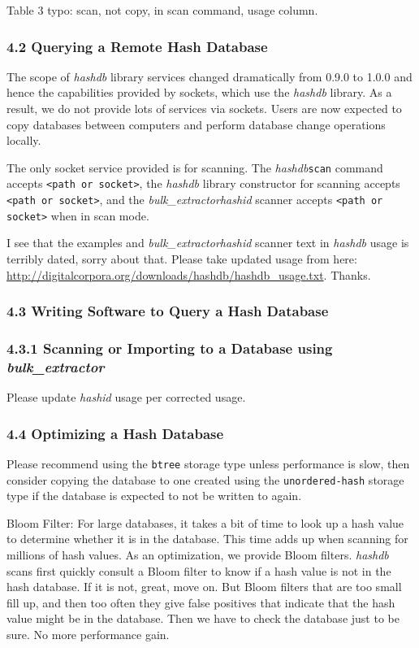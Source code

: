 \documentclass[12pt,twoside]{article}
\newcommand{\hdb}{\emph{hashdb}\xspace}
\newcommand{\bulk}{\emph{bulk\_extractor}\xspace}
\newcommand{\hid}{\emph{hashid}\xspace}
\begin{document}
Table 3 typo: scan, not copy, in scan command, usage column.

\subsubsection*{4.2 Querying a Remote Hash Database}
The scope of \hdb library services changed dramatically from 0.9.0 to 1.0.0
and hence the capabilities provided by sockets, which use the \hdb library.
As a result, we do not provide lots of services via sockets.
Users are now expected to copy databases between computers and perform
database change operations locally.

The only socket service provided is for scanning.
The \hdb \texttt{scan} command accepts \texttt{<path or socket>},
the \hdb library constructor for scanning accepts \texttt{<path or socket>},
and the \bulk \hid scanner accepts \texttt{<path or socket>}
when in scan mode.

I see that the examples and \bulk \hid scanner text in \hdb usage
is terribly dated, sorry about that.
Please take updated usage from here:
\url{http://digitalcorpora.org/downloads/hashdb/hashdb\_usage.txt}.
Thanks.

\subsubsection*{4.3 Writing Software to Query a Hash Database}
\subsubsection*{4.3.1 Scanning or Importing to a Database using \bulk}
Please update \hid usage per corrected usage.

\subsubsection*{4.4 Optimizing a Hash Database}
Please recommend using the \texttt{btree} storage type
unless performance is slow,
then consider copying the database to one created
using the \texttt{unordered-hash}
storage type if the database is expected to not be written to again.

Bloom Filter:
For large databases, it takes a bit of time to look up a hash value
to determine whether it is in the database.
This time adds up when scanning for millions of hash values.
As an optimization, we provide Bloom filters.
\hdb scans first quickly consult a Bloom filter to know if a hash value
is not in the hash database.
If it is not, great, move on.
But Bloom filters that are too small fill up,
and then too often they give false positives
that indicate that the hash value might be in the database.
Then we have to check the database just to be sure.
No more performance gain.
\end{document}
